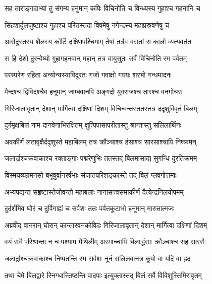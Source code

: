 
\twolineshloka
{सह ताराङ्गदाभ्यां तु संगम्य हनुमान् कपिः}
{विचिनोति च विन्ध्यस्य गुहाश्च गहनानि च} %

\twolineshloka
{सिंहशार्दूलजुष्टाश्च गुहाश्च परितस्तदा}
{विषमेषु नगेन्द्रस्य महाप्रस्रवणेषु च} %

\twolineshloka
{आसेदुस्तस्य शैलस्य कोटिं दक्षिणपश्चिमाम्}
{तेषां तत्रैव वसतां स कालो व्यत्यवर्तत} %

\twolineshloka
{स हि देशो दुरन्वेष्यो गुहागहनवान् महान्}
{तत्र वायुसुतः सर्वं विचिनोति स्म पर्वतम्} %

\twolineshloka
{परस्परेण रहिता अन्योन्यस्याविदूरतः}
{गजो गवाक्षो गवयः शरभो गन्धमादनः} %

\twolineshloka
{मैन्दश्च द्विविदश्चैव हनूमान् जाम्बवानपि}
{अङ्गदो युवराजश्च तारश्च वनगोचरः} %

\twolineshloka
{गिरिजालावृतान् देशान् मार्गित्वा दक्षिणां दिशम्}
{विचिन्वन्तस्ततस्तत्र ददृशुर्विवृतं बिलम्} %

\twolineshloka
{दुर्गमृक्षबिलं नाम दानवेनाभिरक्षितम्}
{क्षुत्पिपासापरीतास्तु श्रान्तास्तु सलिलार्थिनः} %

\twolineshloka
{अवकीर्णं लतावृक्षैर्ददृशुस्ते महाबिलम्}
{तत्र क्रौञ्चाश्च हंसाश्च सारसाश्चापि निष्क्रमन्} %

\twolineshloka
{जलार्द्राश्चक्रवाकाश्च रक्ताङ्गाः पद्मरेणुभिः}
{ततस्तद् बिलमासाद्य सुगन्धि दुरतिक्रमम्} %

\twolineshloka
{विस्मयव्यग्रमनसो बभूवुर्वानरर्षभाः}
{संजातपरिशङ्कास्ते तद् बिलं प्लवगोत्तमाः} %

\twolineshloka
{अभ्यपद्यन्त संहृष्टास्तेजोवन्तो महाबलाः}
{नानासत्त्वसमाकीर्णं दैत्येन्द्रनिलयोपमम्} %

\twolineshloka
{दुर्दर्शमिव घोरं च दुर्विगाह्यं च सर्वशः}
{ततः पर्वतकूटाभो हनूमान् मारुतात्मजः} %

\twolineshloka
{अब्रवीद् वानरान् घोरान् कान्तारवनकोविदः}
{गिरिजालावृतान् देशान् मार्गित्वा दक्षिणां दिशम्} %

\twolineshloka
{वयं सर्वे परिश्रान्ता न च पश्याम मैथिलीम्}
{अस्माच्चापि बिलाद्धंसाः क्रौञ्चाश्च सह सारसैः} %

\twolineshloka
{जलार्द्राश्चक्रवाकाश्च निष्पतन्ति स्म सर्वशः}
{नूनं सलिलवानत्र कूपो वा यदि वा ह्रदः} %

\twolineshloka
{तथा चेमे बिलद्वारे स्निग्धास्तिष्ठन्ति पादपाः}
{इत्युक्तास्तद् बिलं सर्वे विविशुस्तिमिरावृतम्} %

